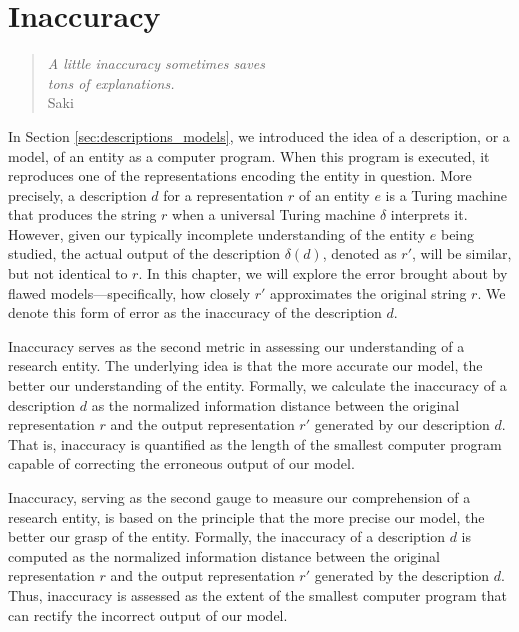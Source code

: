 %
%


\chapter{Inaccuracy}
\label{chap:Error}

\begin{quote}
\begin{flushright}
\emph{A little inaccuracy sometimes saves\\
tons of explanations.}\\
Saki
\end{flushright}
\end{quote}
\bigskip

In Section \ref{sec:descriptions_models}, we introduced the idea of a description, or a model, of an entity as a computer program. When this program is executed, it reproduces one of the representations encoding the entity in question. More precisely, a description $d$ for a representation $r$ of an entity $e$ is a Turing machine that produces the string $r$ when a universal Turing machine $\delta$ interprets it. However, given our typically incomplete understanding of the entity $e$ being studied, the actual output of the description $\delta(d)$, denoted as $r'$, will be similar, but not identical to $r$. In this chapter, we will explore the error brought about by flawed models—specifically, how closely $r'$ approximates the original string $r$. We denote this form of error as the inaccuracy of the description $d$.

Inaccuracy serves as the second metric in assessing our understanding of a research entity. The underlying idea is that the more accurate our model, the better our understanding of the entity. Formally, we calculate the inaccuracy of a description $d$ as the normalized information distance between the original representation $r$ and the output representation $r'$ generated by our description $d$. That is, inaccuracy is quantified as the length of the smallest computer program capable of correcting the erroneous output of our model.

Inaccuracy, serving as the second gauge to measure our comprehension of a research entity, is based on the principle that the more precise our model, the better our grasp of the entity. Formally, the inaccuracy of a description $d$ is computed as the normalized information distance between the original representation $r$ and the output representation $r'$ generated by the description $d$. Thus, inaccuracy is assessed as the extent of the smallest computer program that can rectify the incorrect output of our model.

